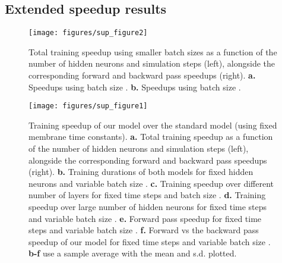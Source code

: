\documentclass{article} \usepackage{iclr2023_conference,times}
\begin{document}
\subsection{Extended speedup results}
\begin{figure}[h!]
    \texttt{[image: figures/sup\_figure2]}
	\centering
	\caption{Total training speedup using smaller batch sizes as a function of the number of hidden neurons  and simulation steps  (left), alongside the corresponding forward and backward pass speedups (right). \textbf{a.} Speedups using batch size . \textbf{b.} Speedups using batch size .}
	\label{fig:speedup_batch}
\end{figure}
\begin{figure}[h!]
    \texttt{[image: figures/sup\_figure1]}
	\centering
	\caption{Training speedup of our model over the standard model (using fixed membrane time constants). \textbf{a.} Total training speedup as a function of the number of hidden neurons  and simulation steps  (left), alongside the corresponding forward and backward pass speedups (right). \textbf{b.} Training durations of both models for fixed hidden neurons  and variable batch size . \textbf{c.} Training speedup over different number of layers for fixed time steps  and batch size . \textbf{d.} Training speedup over large number of hidden neurons  for fixed time steps  and variable batch size . \textbf{e.} Forward pass speedup for fixed time steps  and variable batch size . \textbf{f.} Forward vs the backward pass speedup of our model for fixed time steps  and variable batch size . \textbf{b-f} use a  sample average with the mean and s.d. plotted.}
	\label{fig:speedup_fixed}
\end{figure}
\end{document}
